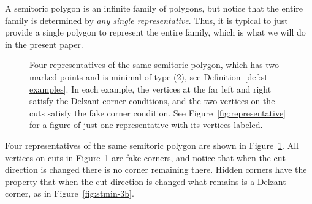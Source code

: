 \documentclass[pdftex]{sigma}
\numberwithin{equation}{section}
\begin{document}
A semitoric polygon is an infinite family of polygons, but notice that the entire family is determined by \emph{any single representative}. Thus, it is typical to just provide a single polygon to represent the entire family, which is what we will do in the present paper.

\begin{figure}
 \centering
 \caption{Four representatives of the same semitoric polygon, which has two marked points and is minimal of type (2), see Definition~\ref{def:st-examples}. In each example, the vertices at the far left and right satisfy the Delzant corner conditions, and the two vertices on the cuts satisfy the fake corner condition. See Figure~\ref{fig:representative} for a figure of just one representative with its vertices labeled.}
 \label{fig:semitoric-4reps-example}
\end{figure}

Four representatives of the same semitoric polygon are shown in Figure~\ref{fig:semitoric-4reps-example}.
All vertices on cuts in Figure~\ref{fig:semitoric-4reps-example} are fake corners, and notice that when the cut direction is changed there is no corner remaining there. Hidden corners have the property that when the cut direction is changed what remains is a Delzant corner, as in Figure~\ref{fig:stmin-3b}.
\end{document}

